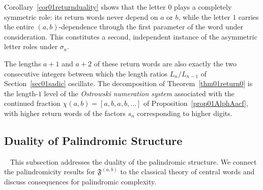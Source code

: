 \documentclass[12pt]{amsart}
\theoremstyle{plain}
\theoremstyle{definition}
\theoremstyle{remark}
\newcommand{\FD}{\mathfrak{F}}
\begin{document}
Corollary~\ref{cor01returnduality} shows that the letter $0$ plays a
completely symmetric role: its return words never depend on $a$ or $b$,
while the letter $1$ carries the entire $(a,b)$-dependence through the
first parameter of the word under consideration. This constitutes a
second, independent instance of the asymmetric letter roles under $\sigma_a$.

The lengths
$a+1$ and $a+2$ of these return words are also exactly the two
consecutive integers between which the length ratios $L_n/L_{n-1}$ of
Section~\ref{sec01sadic} oscillate. The decomposition of
Theorem~\ref{thm01return0} is the length-$1$ level of the
\emph{Ostrowski numeration system} associated with the continued
fraction $\chi(a,b)=[a,b,a,b,\ldots]$ of
Proposition~\ref{prop01AlphAacf}, with higher return words of the
factors $s_n$ corresponding to higher digits. 

\subsection{Duality of Palindromic Structure}~\label{sec01palduality}
This subsection addresses the duality of the palindromic structure. We connect the palindromicity results for $\FD^{(a,b)}$ to the classical theory of central words and discuss consequences for palindromic complexity.
\end{document}

